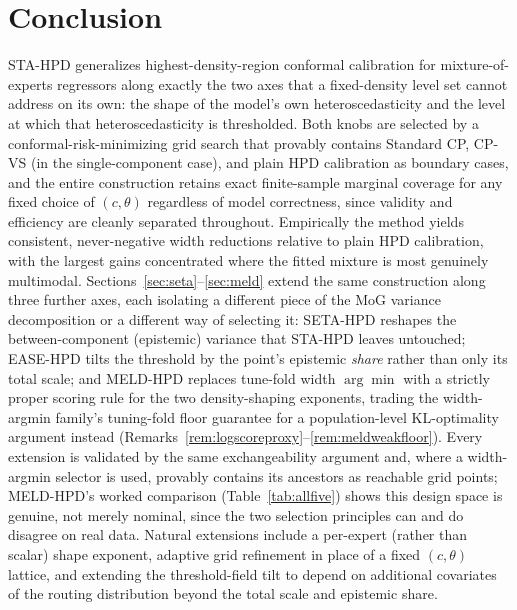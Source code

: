 \documentclass[10pt,twocolumn,a4paper]{article}
\begin{document}
\section{Conclusion}
\label{sec:conclusion}
STA-HPD generalizes highest-density-region conformal calibration for mixture-of-experts regressors
along exactly the two axes that a fixed-density level set cannot address on its own: the shape of
the model's own heteroscedasticity and the level at which that heteroscedasticity is thresholded.
Both knobs are selected by a conformal-risk-minimizing grid search that provably contains Standard
CP, CP-VS (in the single-component case), and plain HPD calibration as boundary cases, and the
entire construction retains exact finite-sample marginal coverage for any fixed choice of
$(c,\theta)$ regardless of model correctness, since validity and efficiency are cleanly separated
throughout. Empirically the method yields consistent, never-negative width reductions relative to
plain HPD calibration, with the largest gains concentrated where the fitted mixture is most
genuinely multimodal. Sections~\ref{sec:seta}--\ref{sec:meld} extend the same construction along
three further axes, each isolating a different piece of the MoG variance decomposition or a
different way of selecting it: SETA-HPD reshapes the between-component (epistemic) variance that
STA-HPD leaves untouched; EASE-HPD tilts the threshold by the point's epistemic \emph{share} rather
than only its total scale; and MELD-HPD replaces tune-fold width $\arg\min$ with a strictly proper
scoring rule for the two density-shaping exponents, trading the width-argmin family's tuning-fold
floor guarantee for a population-level KL-optimality argument instead
(Remarks~\ref{rem:logscoreproxy}--\ref{rem:meldweakfloor}). Every extension is validated by the same
exchangeability argument and, where a width-argmin selector is used, provably contains its ancestors
as reachable grid points; MELD-HPD's worked comparison (Table~\ref{tab:allfive}) shows this design
space is genuine, not merely nominal, since the two selection principles can and do disagree on real
data. Natural extensions include a per-expert (rather than scalar) shape exponent,
adaptive grid refinement in place of a fixed $(c,\theta)$ lattice, and extending the threshold-field
tilt to depend on additional covariates of the routing distribution beyond the total scale and
epistemic share.
\end{document}
